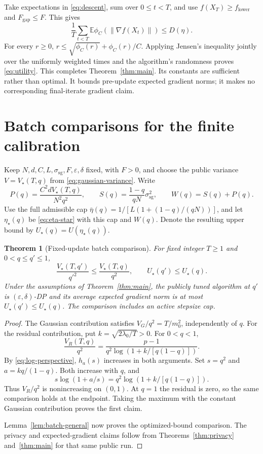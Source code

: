 \documentclass[11pt]{article}
\newtheorem{theorem}{Theorem}[section]
\newcommand{\E}{\mathbb E}
\newcommand{\norm}[1]{\left\lVert #1\right\rVert}
\newcommand{\sg}{\mathrm{sg}}
\newcommand{\gap}{\mathrm{gap}}
\begin{document}
Take expectations in \eqref{eq:descent}, sum over $0\le t<T$, and use
$f(X_T)\ge f_{\mathrm{lower}}$ and $F_{\gap}\le F$. This gives
\begin{equation}\label{eq:progress}
 \frac1T\sum_{t<T}\E\phi_C(\norm{\nabla f(X_t)})\le D(\eta).
\end{equation}
For every $r\ge0$,
$r\le\sqrt{\phi_C(r)}+\phi_C(r)/C$.
Applying Jensen's inequality jointly over the uniformly weighted times and
the algorithm's randomness proves \eqref{eq:utility}.
This completes Theorem~\ref{thm:main}. Its constants are sufficient rather
than optimal. It bounds pre-update expected gradient norms; it makes no
corresponding final-iterate gradient claim.

\section{Batch comparisons for the finite calibration}
\label{sec:batch}
Keep $N,d,C,L,\sigma_{\sg},F,\varepsilon,\delta$ fixed, with $F>0$,
and choose the public variance $V=V_\star(T,q)$ from
\eqref{eq:gaussian-variance}. Write
\[
 P(q)=\frac{C^2dV_\star(T,q)}{N^2q^2},\qquad
 S(q)=\frac{1-q}{qN}\sigma_{\sg}^2,\qquad W(q)=S(q)+P(q).
\]
Use the full admissible cap $\bar\eta(q)=1/[L(1+(1-q)/(qN))]$,
and let $\eta_\star(q)$ be \eqref{eq:eta-star} with this cap and $W(q)$.
Denote the resulting upper bound by $U_\star(q)=U(\eta_\star(q))$.

\begin{theorem}[Fixed-update batch comparison]\label{thm:batch}
For fixed integer $T\ge1$ and $0<q\le q'\le1$,
\[
 \frac{V_\star(T,q')}{q'^2}\le\frac{V_\star(T,q)}{q^2},
 \qquad U_\star(q')\le U_\star(q).
\]
Under the assumptions of Theorem~\ref{thm:main}, the publicly tuned algorithm
at $q'$ is $(\varepsilon,\delta)$-DP and its average expected gradient norm
is at most $U_\star(q')\le U_\star(q)$. The comparison includes an active
stepsize cap.
\end{theorem}
\begin{proof}
The Gaussian contribution satisfies $V_G/q^2=T/m_0^2$, independently of $q$.
For the residual contribution, put $k=\sqrt{2\lambda_0/T}>0$. For $0<q<1$,
\[
 \frac{V_R(T,q)}{q^2}
 =\frac{p-1}{q^2\log(1+k/[q(1-q)])}.
\]
By \eqref{eq:log-perspective}, $h_a(s)$ increases in both arguments.
Set $s=q^2$ and $a=kq/(1-q)$. Both increase with $q$, and
\[
 s\log(1+a/s)=q^2\log(1+k/[q(1-q)]).
\]
Thus $V_R/q^2$ is nonincreasing on $(0,1)$. At $q=1$ the residual is zero,
so the same comparison holds at the endpoint. Taking the maximum with the
constant Gaussian contribution proves the first claim.

Lemma~\ref{lem:batch-general} now proves the optimized-bound comparison.
The privacy and expected-gradient claims follow from
Theorems~\ref{thm:privacy} and~\ref{thm:main} for that same public run.
\end{proof}
\end{document}
